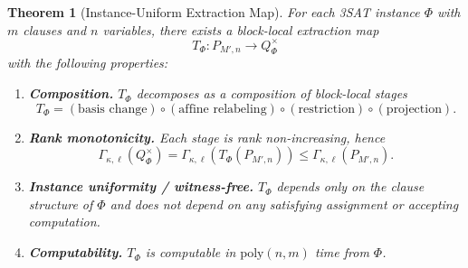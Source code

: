\documentclass[12pt]{article}
\newtheorem{theorem}{Theorem}
\theoremstyle{definition}
\theoremstyle{definition}
\theoremstyle{remark}
\theoremstyle{remark}
\begin{document}
\begin{theorem}[Instance-Uniform Extraction Map]
\label{thm:instance-uniform-extraction}
For each 3SAT instance $\Phi$ with $m$ clauses and $n$ variables, there exists a block-local
extraction map
\[
T_\Phi : P_{M',n} \longrightarrow Q^{\times}_\Phi
\]
with the following properties:
\begin{enumerate}
\item \textbf{Composition.}
$T_\Phi$ decomposes as a composition of block-local stages
\[
T_\Phi = (\text{basis change}) \circ (\text{affine relabeling}) \circ (\text{restriction}) \circ (\text{projection}).
\]
\item \textbf{Rank monotonicity.}
Each stage is rank non-increasing, hence
\[
\Gamma_{\kappa,\ell}(Q^{\times}_\Phi) = \Gamma_{\kappa,\ell}(T_\Phi(P_{M',n})) \le \Gamma_{\kappa,\ell}(P_{M',n}).
\]
\item \textbf{Instance uniformity / witness-free.}
$T_\Phi$ depends only on the clause structure of $\Phi$ and does not depend on any satisfying
assignment or accepting computation.
\item \textbf{Computability.}
$T_\Phi$ is computable in $\mathrm{poly}(n,m)$ time from $\Phi$.
\end{enumerate}
\end{theorem}
\end{document}

